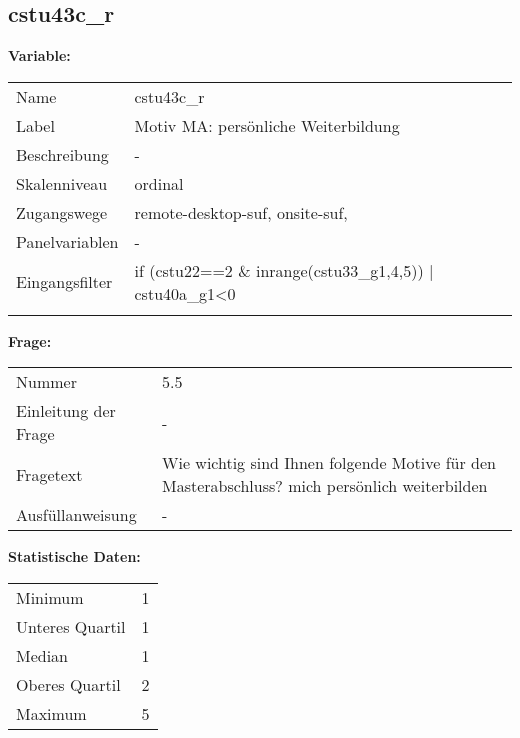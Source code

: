 	
	
	\subsection{cstu43c\_r}
	\label{subSection:cstu43c_r}

	\noindent\textbf{Variable:}\\
		\begin{tabular}{lL{11.3cm}}
			\label{tableVariable:cstu43c_r}
			Name & cstu43c\_r \\
			Label & Motiv MA: persönliche Weiterbildung \\
			Beschreibung & - \\
			Skalenniveau & ordinal \\
			Zugangswege &
				remote-desktop-suf,
				onsite-suf,
 \\
			Panelvariablen & -
			 \\
			Eingangsfilter & if (cstu22==2 \& inrange(cstu33\_g1,4,5)) | cstu40a\_g1\textless{}0 \\
 \\
		\end{tabular}

		\vspace*{1 cm}
		\noindent\textbf{Frage:}\\
		\begin{tabular}{lL{11.3cm}}
			\label{tableQuestion:cstu43c_r}
			Nummer & 5.5 \\
			Einleitung der Frage & - \\
			Fragetext & Wie wichtig sind Ihnen folgende Motive für den Masterabschluss?
mich persönlich weiterbilden \\
			Ausfüllanweisung & - \\
		\end{tabular}


		\vspace*{1 cm}
		\noindent\textbf{Statistische Daten:}\\
			\begin{tabular}{ll}
				\label{tableStatistics:cstu43c_r}
					Minimum & 1 \\
					Unteres Quartil & 1 \\
					Median & 1 \\
					Oberes Quartil & 2 \\
					Maximum & 5 \\
			\end{tabular}



